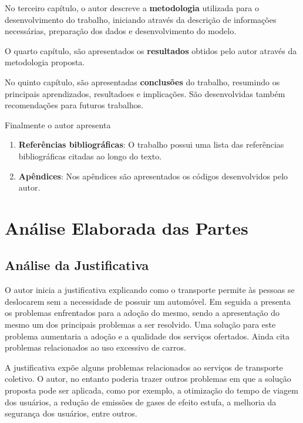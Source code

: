 \documentclass[
    article,
    12pt,
    a4paper,
    english,
    brazil,
    sumario=tradicional
]{/home/lucas_galdino/Desktop/TCC/planning/abntex2/abntex2}
\begin{document}
No terceiro capítulo, o autor descreve a \textbf{metodologia} utilizada para o desenvolvimento do trabalho, iniciando através da descrição de informações necessárias, preparação dos dados e desenvolvimento do modelo. \par

O quarto capítulo, são apresentados os \textbf{resultados} obtidos pelo autor através da metodologia proposta. \par

No quinto capítulo, são apresentadas \textbf{conclusões} do trabalho, resumindo os principais aprendizados, resultadoes e implicações.
São desenvolvidas também recomendações para futuros trabalhos. \par

Finalmente o autor apresenta
\begin{enumerate}
    \item \textbf{Referências bibliográficas}: O trabalho possui uma lista das referências bibliográficas citadas ao longo do texto.
    \item \textbf{Apêndices}: Nos apêndices são apresentados os códigos desenvolvidos pelo autor.
\end{enumerate}\par

\section{Análise Elaborada das Partes}

\subsection{Análise da Justificativa}

O autor inicia a justificativa explicando como o transporte permite às pessoas
se deslocarem sem a necessidade de possuir um automóvel. Em seguida a presenta
os problemas enfrentados para a adoção do mesmo, sendo a apresentação do mesmo
um dos principais problemas a ser resolvido. Uma solução para este problema aumentaria a
adoção e a qualidade dos serviços ofertados. Ainda cita problemas relacionados ao uso
excessivo de carros.\par

A justificativa expõe alguns problemas relacionados ao serviços de transporte coletivo.
O autor, no entanto poderia trazer outros problemas em que a solução proposta pode ser aplicada,
como por exemplo, a otimização do tempo de viagem dos usuários, a redução de emissões de gases de
efeito estufa, a melhoria da segurança dos usuários, entre outros.\par
\end{document}
